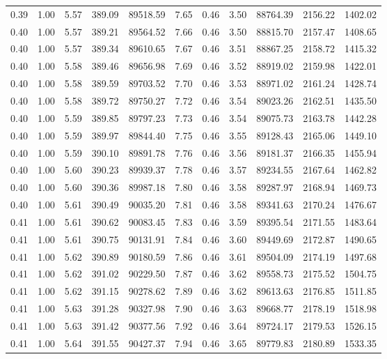 \begin{table}[!ht]
\begin{tabular}{rrrrrrrrrrr}
0.39 & 1.00 & 5.57 & 389.09 & 89518.59 & 7.65 & 0.46 & 3.50 & 88764.39 & 2156.22 & 1402.02 \\
0.40 & 1.00 & 5.57 & 389.21 & 89564.52 & 7.66 & 0.46 & 3.50 & 88815.70 & 2157.47 & 1408.65 \\
0.40 & 1.00 & 5.57 & 389.34 & 89610.65 & 7.67 & 0.46 & 3.51 & 88867.25 & 2158.72 & 1415.32 \\
0.40 & 1.00 & 5.58 & 389.46 & 89656.98 & 7.69 & 0.46 & 3.52 & 88919.02 & 2159.98 & 1422.01 \\
0.40 & 1.00 & 5.58 & 389.59 & 89703.52 & 7.70 & 0.46 & 3.53 & 88971.02 & 2161.24 & 1428.74 \\
0.40 & 1.00 & 5.58 & 389.72 & 89750.27 & 7.72 & 0.46 & 3.54 & 89023.26 & 2162.51 & 1435.50 \\
0.40 & 1.00 & 5.59 & 389.85 & 89797.23 & 7.73 & 0.46 & 3.54 & 89075.73 & 2163.78 & 1442.28 \\
0.40 & 1.00 & 5.59 & 389.97 & 89844.40 & 7.75 & 0.46 & 3.55 & 89128.43 & 2165.06 & 1449.10 \\
0.40 & 1.00 & 5.59 & 390.10 & 89891.78 & 7.76 & 0.46 & 3.56 & 89181.37 & 2166.35 & 1455.94 \\
0.40 & 1.00 & 5.60 & 390.23 & 89939.37 & 7.78 & 0.46 & 3.57 & 89234.55 & 2167.64 & 1462.82 \\
0.40 & 1.00 & 5.60 & 390.36 & 89987.18 & 7.80 & 0.46 & 3.58 & 89287.97 & 2168.94 & 1469.73 \\
0.40 & 1.00 & 5.61 & 390.49 & 90035.20 & 7.81 & 0.46 & 3.58 & 89341.63 & 2170.24 & 1476.67 \\
0.41 & 1.00 & 5.61 & 390.62 & 90083.45 & 7.83 & 0.46 & 3.59 & 89395.54 & 2171.55 & 1483.64 \\
0.41 & 1.00 & 5.61 & 390.75 & 90131.91 & 7.84 & 0.46 & 3.60 & 89449.69 & 2172.87 & 1490.65 \\
0.41 & 1.00 & 5.62 & 390.89 & 90180.59 & 7.86 & 0.46 & 3.61 & 89504.09 & 2174.19 & 1497.68 \\
0.41 & 1.00 & 5.62 & 391.02 & 90229.50 & 7.87 & 0.46 & 3.62 & 89558.73 & 2175.52 & 1504.75 \\
0.41 & 1.00 & 5.62 & 391.15 & 90278.62 & 7.89 & 0.46 & 3.62 & 89613.63 & 2176.85 & 1511.85 \\
0.41 & 1.00 & 5.63 & 391.28 & 90327.98 & 7.90 & 0.46 & 3.63 & 89668.77 & 2178.19 & 1518.98 \\
0.41 & 1.00 & 5.63 & 391.42 & 90377.56 & 7.92 & 0.46 & 3.64 & 89724.17 & 2179.53 & 1526.15 \\
0.41 & 1.00 & 5.64 & 391.55 & 90427.37 & 7.94 & 0.46 & 3.65 & 89779.83 & 2180.89 & 1533.35 \\

\end{tabular}
\end{table}
